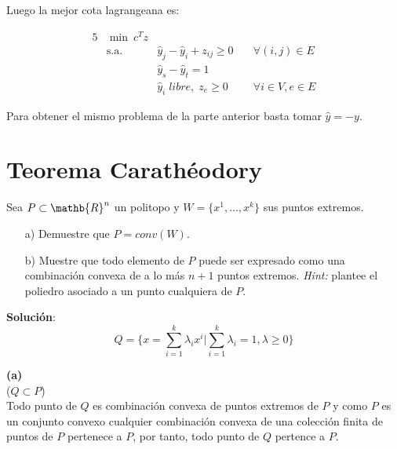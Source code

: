 \documentclass[10pt]{article}
\theoremstyle{plain}
\theoremstyle{definition}
\begin{document}
Luego la mejor cota lagrangeana es:
\begin{center}
\begin{alignat*}{5}
&\min\ c^{T}z\\
&\text{s.a. } &  \hat{y}_{j}-\hat{y}_{i}+z_{ij}\geq 0 & \quad \forall (i,j) \in E\\
&& \hat{y}_{s}-\hat{y}_{t}=1\\
&& \hat{y}_{i} \; libre, \;z_{e} \geq0 & \quad \forall i\in V, e \in E
\end{alignat*}
\end{center}

Para obtener el mismo problema de la parte anterior basta tomar $\hat{y}=-y$.

\section{Teorema Carathéodory}
Sea $P \subset \mathb{R}^{n}$ un politopo y $W=\{x^{1},\ldots, x^{k}\}$ sus puntos extremos.

\begin{itemize}
    \item[a)] Demuestre que $P=conv(W)$.
    \item[b)] Muestre que todo elemento de $P$ puede ser expresado como una combinación convexa de a lo más $n+1$ puntos extremos. \textit{Hint:} plantee el poliedro asociado a un punto cualquiera de $P$.
\end{itemize}

\textbf{Solución}:\\

\begin{equation*}
  Q = \bigg\{x=\sum_{i=1}^{k}\lambda_{i}x^{i}\big| \sum_{i=1}^{k}\lambda_{i}=1, \lambda\geq0\bigg\}
\end{equation*}

\textbf{(a)}\\

($Q\subset P$)\\
Todo punto de $Q$ es combinación convexa de puntos extremos de $P$ y como $P$ es un conjunto convexo cualquier combinación convexa de una colección finita de puntos de $P$ pertenece a $P$, por tanto, todo punto de $Q$ pertence a $P$.
\end{document}
